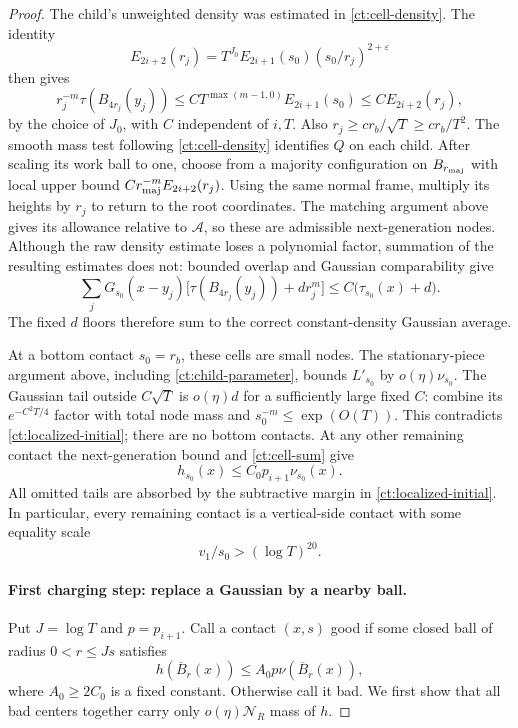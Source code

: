 \begin{proof}
The child's unweighted density was estimated in
\eqref{ct:cell-density}.  The identity
\[
 E_{2i+2}(r_j)=T^{J_0}E_{2i+1}(s_0)(s_0/r_j)^{2+\varepsilon}
\]
then gives
\[
 r_j^{-m}\tau(B_{4r_j}(y_j))
 \le C T^{\max(m-1,0)}E_{2i+1}(s_0)
 \le C E_{2i+2}(r_j),
\]
by the choice of $J_0$, with $C$ independent of $i,T$.
Also $r_j\ge cr_b/\sqrt T\ge cr_b/T^2$.
The smooth mass test following \eqref{ct:cell-density} identifies $Q$
on each child. After scaling its work ball to one, choose from
 a majority configuration on $B_{r_{\rm maj}}$
with local upper bound $C r_{\rm maj}^{-m}E_{2i+2}(r_j)$.
Using the same normal frame, multiply its heights by $r_j$ to return
to the root coordinates.
The matching argument above gives its allowance relative to
$\mathcal A$, so these are admissible next-generation
nodes.  Although the raw density estimate loses a polynomial factor,
summation of the resulting estimates does not: bounded overlap and
Gaussian comparability give
\begin{equation}\label{ct:cell-sum}
 \sum_jG_{s_0}(x-y_j)
       \bigl[\tau(B_{4r_j}(y_j))+dr_j^m\bigr]
 \le C\bigl(\tau_{s_0}(x)+d\bigr).
\end{equation}
The fixed $d$ floors therefore sum to the correct constant-density
Gaussian average.

At a bottom contact $s_0=r_b$, these cells are small nodes.  The
stationary-piece argument above, including
\eqref{ct:child-parameter}, bounds $L'_{s_0}$ by
$o(\eta)\nu_{s_0}$.  The Gaussian tail outside $C\sqrt T$ is
$o(\eta)d$ for a sufficiently large fixed $C$: combine its
$e^{-C^2T/4}$ factor with total node mass and
$s_0^{-m}\le\exp(O(T))$.  This contradicts
\eqref{ct:localized-initial}; there are no bottom contacts.
At any other remaining contact the next-generation bound and
\eqref{ct:cell-sum} give
\begin{equation}\label{ct:child-contact-bound}
 h_{s_0}(x)\le C_0p_{i+1}\nu_{s_0}(x).
\end{equation}
All omitted tails are absorbed by the subtractive margin in
\eqref{ct:localized-initial}.  In particular, every remaining contact
is a vertical-side contact with some equality scale
\begin{equation}\label{ct:remote-side}
 v_1/s_0>(\log T)^{20}.
\end{equation}

\paragraph{First charging step: replace a Gaussian by a nearby ball.}
Put $J=\log T$ and $p=p_{i+1}$.  Call a contact $(x,s)$ good if some
closed ball of radius $0<r\le Js$ satisfies
\begin{equation}\label{ct:good-ball}
 h(\overline B_r(x))\le A_0p\nu(\overline B_r(x)),
\end{equation}
where $A_0\ge2C_0$ is a fixed constant.  Otherwise call it bad.
We first show that all bad centers together carry only
$o(\eta)\mathcal N_R$ mass of $h$.


\end{proof}
